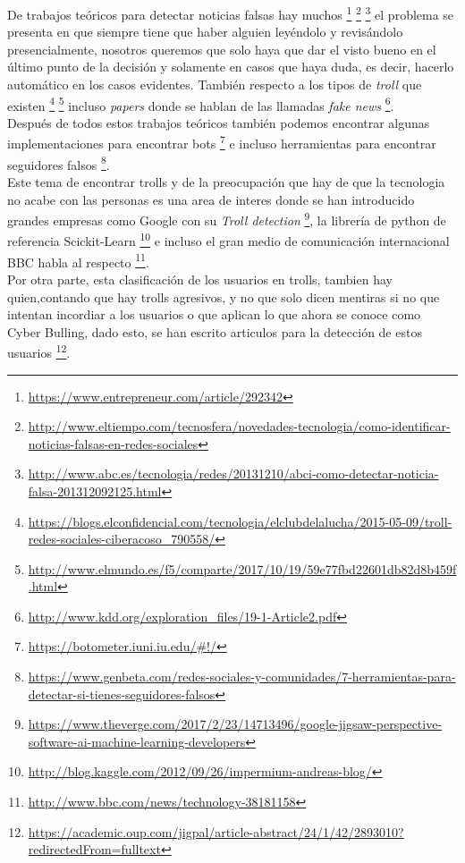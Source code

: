 \documentclass[../all.tex]{subfiles}
\begin{document}
    De trabajos teóricos para detectar noticias falsas hay muchos
    \footnote{\tiny\url{https://www.entrepreneur.com/article/292342}}
    \footnote{\tiny\url{http://www.eltiempo.com/tecnosfera/novedades-tecnologia/como-identificar-noticias-falsas-en-redes-sociales}}
    \footnote{\tiny\url{http://www.abc.es/tecnologia/redes/20131210/abci-como-detectar-noticia-falsa-201312092125.html}} el problema se presenta en que siempre tiene que haber alguien leyéndolo y revisándolo presencialmente, nosotros queremos que solo haya que dar el visto bueno en el último punto de la decisión  y solamente en casos que haya duda, es decir, hacerlo automático en los casos evidentes.  También respecto a los tipos de \textit{troll} que existen \footnote{\tiny\url{https://blogs.elconfidencial.com/tecnologia/elclubdelalucha/2015-05-09/troll-redes-sociales-ciberacoso_790558/}}
    \footnote{\tiny\url{http://www.elmundo.es/f5/comparte/2017/10/19/59e77fbd22601db82d8b459f.html}} incluso \textit{papers} donde se hablan de las llamadas \textit{fake news} \footnote{\tiny\url{http://www.kdd.org/exploration_files/19-1-Article2.pdf}}.\\

    Después de todos estos trabajos teóricos también podemos encontrar algunas implementaciones para encontrar bots \footnote{\tiny\url{https://botometer.iuni.iu.edu/\#!/}} e incluso herramientas para encontrar seguidores falsos \footnote{\tiny\url{https://www.genbeta.com/redes-sociales-y-comunidades/7-herramientas-para-detectar-si-tienes-seguidores-falsos}}.\\
    
    Este tema de encontrar trolls y de la preocupación que hay de que la tecnologia no acabe con las personas es una area de interes donde se han introducido grandes empresas como Google con su 
    \textit{Troll detection} \footnote{\tiny\url{https://www.theverge.com/2017/2/23/14713496/google-jigsaw-perspective-software-ai-machine-learning-developers}}, la librería de python de referencia Scickit-Learn \footnote{\tiny\url{http://blog.kaggle.com/2012/09/26/impermium-andreas-blog/}}
    e incluso el gran medio de comunicación internacional BBC habla al respecto
    \footnote{\tiny \url{http://www.bbc.com/news/technology-38181158}}.\\
    
    Por otra parte, esta clasificación de los usuarios en trolls, tambien hay quien,contando que hay trolls agresivos, y no que solo dicen mentiras si no que intentan incordiar a los usuarios o que aplican lo que ahora se conoce como Cyber Bulling, dado esto, se han escrito articulos para la detección de estos usuarios \footnote{\tiny\url{https://academic.oup.com/jigpal/article-abstract/24/1/42/2893010?redirectedFrom=fulltext}}.\\
    

   
\end{document}
